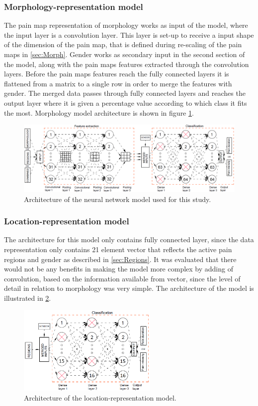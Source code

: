 \subsubsection{Morphology-representation model}
The pain map representation of morphology works as input of the model, where the input layer is a convolution layer. This layer is set-up to receive a input shape of the dimension of the pain map, that is defined during re-scaling of the pain maps in \ref{sec:Morph}. Gender works as secondary input in the second section of the model, along with the pain maps features extracted through the convolution layers. Before the pain maps features reach the fully connected layers it is flattened from a matrix to a single row in order to merge the features with gender. The merged data passes through fully connected layers and reaches the output layer where it is given a percentage value according to which class it fits the most. Morphology model architecture is shown in figure \ref{fig:Schema1}.

\begin{figure} [H]
\centering
\includegraphics[width=1.0\textwidth]{figures/Schema1}
\caption{Architecture of the neural network model used for this study.}
\label{fig:Schema1} 
\end{figure}

\subsubsection{Location-representation model}
The architecture for this model only contains fully connected layer, since the data representation only contains 21 element vector that reflects the active pain regions and gender as described in \ref{sec:Regions}. It was evaluated that there would not be any benefits in making the model more complex by adding of convolution, based on the information available from vector, since the level of detail in relation to morphology was very simple. The architecture of the model is illustrated in \ref{fig:Simpleschema}.

\begin{figure} [H]
\centering
\includegraphics[width=0.6\textwidth]{figures/Simpleschema}
\caption{Architecture of the location-representation model.}
\label{fig:Simpleschema} 
\end{figure}

